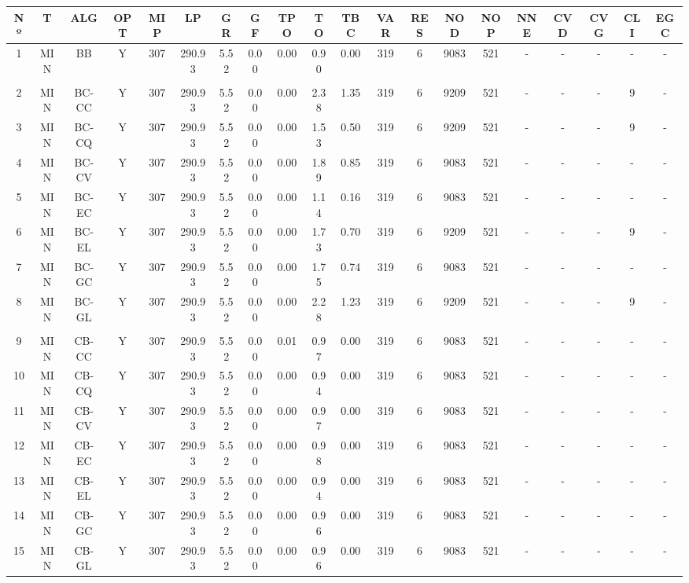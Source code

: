 {
\footnotesize\centering
\hspace*{-5mm}\begin{tabular}{ *{19}{c|} c }
\hline
\textbf{Nº} & \textbf{T} & \textbf{ALG} & \textbf{OPT} & \textbf{MIP} & \textbf{LP} & \textbf{GR} & \textbf{GF} & \textbf{TPO} & \textbf{TO} & \textbf{TBC} & \textbf{VAR} & \textbf{RES} & \textbf{NOD} & \textbf{NOP} & \textbf{NNE} & \textbf{CVD} & \textbf{CVG} & \textbf{CLI} & \textbf{EGC}\\
\hline
1 & MIN & BB & Y & 307 & 290.93 & 5.52 & 0.00 & 0.00 & 0.90 & 0.00 & 319 & 6 & 9083 & 521 & - & - & - & - & -\\
\hline
\multicolumn{20}{c}{}
\\
\hline
2 & MIN & BC-CC & Y & 307 & 290.93 & 5.52 & 0.00 & 0.00 & 2.38 & 1.35 & 319 & 6 & 9209 & 521 & - & - & - & 9 & -\\
\hline
3 & MIN & BC-CQ & Y & 307 & 290.93 & 5.52 & 0.00 & 0.00 & 1.53 & 0.50 & 319 & 6 & 9209 & 521 & - & - & - & 9 & -\\
\hline
4 & MIN & BC-CV & Y & 307 & 290.93 & 5.52 & 0.00 & 0.00 & 1.89 & 0.85 & 319 & 6 & 9083 & 521 & - & - & - & - & -\\
\hline
5 & MIN & BC-EC & Y & 307 & 290.93 & 5.52 & 0.00 & 0.00 & 1.14 & 0.16 & 319 & 6 & 9083 & 521 & - & - & - & - & -\\
\hline
6 & MIN & BC-EL & Y & 307 & 290.93 & 5.52 & 0.00 & 0.00 & 1.73 & 0.70 & 319 & 6 & 9209 & 521 & - & - & - & 9 & -\\
\hline
7 & MIN & BC-GC & Y & 307 & 290.93 & 5.52 & 0.00 & 0.00 & 1.75 & 0.74 & 319 & 6 & 9083 & 521 & - & - & - & - & -\\
\hline
8 & MIN & BC-GL & Y & 307 & 290.93 & 5.52 & 0.00 & 0.00 & 2.28 & 1.23 & 319 & 6 & 9209 & 521 & - & - & - & 9 & -\\
\hline
\multicolumn{20}{c}{}
\\
\hline
9 & MIN & CB-CC & Y & 307 & 290.93 & 5.52 & 0.00 & 0.01 & 0.97 & 0.00 & 319 & 6 & 9083 & 521 & - & - & - & - & -\\
\hline
10 & MIN & CB-CQ & Y & 307 & 290.93 & 5.52 & 0.00 & 0.00 & 0.94 & 0.00 & 319 & 6 & 9083 & 521 & - & - & - & - & -\\
\hline
11 & MIN & CB-CV & Y & 307 & 290.93 & 5.52 & 0.00 & 0.00 & 0.97 & 0.00 & 319 & 6 & 9083 & 521 & - & - & - & - & -\\
\hline
12 & MIN & CB-EC & Y & 307 & 290.93 & 5.52 & 0.00 & 0.00 & 0.98 & 0.00 & 319 & 6 & 9083 & 521 & - & - & - & - & -\\
\hline
13 & MIN & CB-EL & Y & 307 & 290.93 & 5.52 & 0.00 & 0.00 & 0.94 & 0.00 & 319 & 6 & 9083 & 521 & - & - & - & - & -\\
\hline
14 & MIN & CB-GC & Y & 307 & 290.93 & 5.52 & 0.00 & 0.00 & 0.96 & 0.00 & 319 & 6 & 9083 & 521 & - & - & - & - & -\\
\hline
15 & MIN & CB-GL & Y & 307 & 290.93 & 5.52 & 0.00 & 0.00 & 0.96 & 0.00 & 319 & 6 & 9083 & 521 & - & - & - & - & -\\
\hline
\end{tabular}\\
\vspace{4mm}
}


